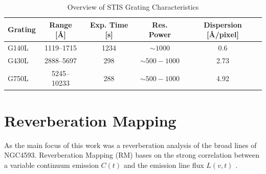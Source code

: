 \begin{table}[h!]
	\centering
	\small
	\caption{Overview of STIS Grating Characteristics \parencite{stisgratings}}
	\label{tab:stis_gratings}
	\begin{tabular}{lcccc}
		\hline
		\textbf{Grating} & \textbf{Range [\AA]} & \textbf{Exp. Time [s]} & \textbf{Res. Power} & \textbf{Dispersion [\AA/pixel]} \\
		\hline
		G140L  & 1119--1715  & 1234 & $\sim 1000$         & 0.6 \\
		G430L  & 2888--5697  & 298  & $\sim 500 - 1000$    & 2.73 \\
		G750L  & 5245--10233 & 288  & $\sim 500 - 1000$    & 4.92 \\
		\hline
	\end{tabular}
\end{table}

\section{Reverberation Mapping}

As the main focus of this work was a reverberation analysis of the broad lines of NGC4593. Reverberation Mapping (RM) bases on the strong correlation between a variable continuum emission $C\left(t\right)$ and the emission line flux $L\left(v,t\right)$ \parencite{horne2021space}.